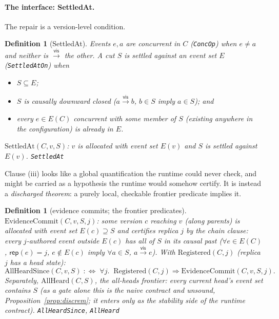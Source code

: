 \documentclass[11pt]{article}
\newtheorem{definition}[theorem]{Definition}
\newcommand{\vis}{\xrightarrow{\mathsf{vis}}}
\newcommand{\lean}[1]{\texttt{#1}}
\begin{document}
\paragraph{The interface: SettledAt.} The repair is a version-level
condition.

\begin{definition}[SettledAt]
\label{def:settled}
Events $e, a$ are \emph{concurrent} in $C$ (\lean{ConcOp}) when
$e \neq a$ and neither is $\vis$ the other. A cut $S$ is settled
against an event set $E$ (\lean{SettledAtOn}) when
\begin{itemize}[leftmargin=2.2em]
\item[(i)] $S \subseteq E$;
\item[(ii)] $S$ is causally downward closed ($a \vis b$, $b \in S$
  imply $a \in S$); and
\item[(iii)] every $e \in E(C)$ concurrent with some member of $S$
  (\emph{existing anywhere in the configuration}) is already in $E$.
\end{itemize}
$\mathrm{SettledAt}(C, v, S)$: $v$ is allocated with event set $E(v)$
and $S$ is settled against $E(v)$.
\hfill\lean{SettledAt}
\end{definition}

Clause (iii) looks like a global quantification the
runtime could never check, and might be carried as a
hypothesis the runtime would somehow certify. It is instead a
\emph{discharged theorem}: a purely local, checkable frontier predicate
implies it.

\begin{definition}[evidence commits; the frontier predicates]
\label{def:evidence}
$\mathrm{EvidenceCommit}(C, v, S, j)$: some version $c$ reaching $v$
(along parents) is allocated with event set $E(c) \supseteq S$ and
certifies replica $j$ by the chain clause: every $j$-authored event
outside $E(c)$ has all of $S$ in its causal past
($\forall e \in E(C)$, $\mathsf{rep}(e) = j$, $e \notin E(c)$ imply
$\forall a \in S$, $a \vis e$). With
$\mathrm{Registered}(C, j)$ (replica $j$ has a head state):
\[
  \mathrm{AllHeardSince}(C, v, S) \;:\Longleftrightarrow\;
  \forall j.\;\; \mathrm{Registered}(C, j) \Rightarrow
  \mathrm{EvidenceCommit}(C, v, S, j) .
\]
Separately, $\mathrm{AllHeard}(C, S)$, the \emph{all-heads frontier}:
every current head's event set contains $S$ (as a gate alone this is
the naive contract and unsound, Proposition~\ref{prop:discrem}; it
enters only as the stability side of the runtime contract).
\hfill\lean{AllHeardSince}, \lean{AllHeard}
\end{definition}
\end{document}
